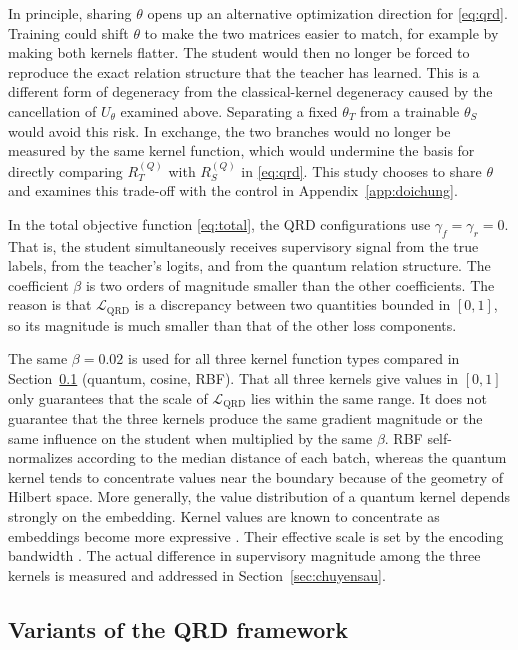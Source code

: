 In principle, sharing $\theta$ opens up an alternative optimization
direction for \eqref{eq:qrd}. Training could shift $\theta$ to make the two matrices easier to match, for example by making both kernels flatter. The student would then no longer be forced to reproduce the exact relation structure that the teacher has learned. This is a different
form of degeneracy from the classical-kernel degeneracy caused by the
cancellation of $U_\theta$ examined above. Separating a fixed $\theta_T$ from a trainable $\theta_S$ would avoid this risk. In exchange, the two branches would no longer be measured by the same kernel function, which would undermine the basis for directly
comparing $R_T^{(Q)}$ with $R_S^{(Q)}$ in \eqref{eq:qrd}. This study
chooses to share $\theta$ and examines this trade-off with the
control in Appendix~\ref{app:doichung}.

In the total objective function \eqref{eq:total}, the QRD
configurations use $\gamma_f = \gamma_r = 0$. That is, the student
simultaneously receives supervisory signal from the true labels, from
the teacher's logits, and from the quantum relation structure. The coefficient $\beta$ is two orders of magnitude smaller than the other coefficients. The reason is that $\mathcal{L}_{\mathrm{QRD}}$ is a discrepancy between two quantities bounded in $[0,1]$, so its magnitude is much smaller than that of the other loss components.

The same $\beta = 0.02$ is used for all three kernel function types
compared in Section~\ref{sec:bienthe} (quantum, cosine, RBF). That all three kernels give values in $[0,1]$ only guarantees that the scale of $\mathcal{L}_{\mathrm{QRD}}$ lies within the same range. It does not guarantee that the three kernels produce the same gradient magnitude or the same influence on the student when multiplied by the same $\beta$. RBF self-normalizes according
to the median distance of each batch, whereas the quantum kernel
tends to concentrate values near the boundary because of the
geometry of Hilbert space. More generally, the value distribution of a quantum kernel depends strongly on the embedding. Kernel values are known to concentrate as embeddings become more expressive \cite{thanasilp2024exponential}. Their effective scale is set by the encoding bandwidth \cite{shaydulin2022importance}. The actual
difference in supervisory magnitude among the three kernels is
measured and addressed in Section~\ref{sec:chuyensau}.

\subsection{Variants of the QRD framework}
\label{sec:bienthe}

